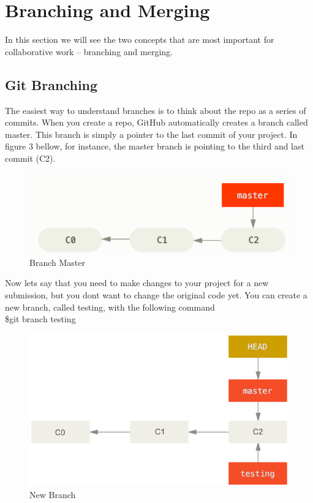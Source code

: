 \documentclass[12pt]{article}
\begin{document}
    \section{Branching and Merging}
    In this section we will see the two concepts that are most important for collaborative work -- branching and merging.
    \subsection{Git Branching}
    \label{sec:branching}
    The easiest way to understand branches is to think about the repo as a series of commits. When you create a repo, GitHub automatically creates a branch called master. This branch is simply a pointer to the last commit of your project. In figure 3 bellow, for instance, the master branch is pointing to the third and last commit (C2). \\
    \begin{figure}[h]
	\caption{Branch Master}
	\includegraphics[scale=0.5]{figure4}
	\centering
    \end{figure} 
    \vspace{0.2 in}
    Now let\textquotesingle s say that you need to make changes to your project for a new submission, but you don\textquotesingle t want to change the original code yet. You  can create a new branch, called testing, with the following command \\
    \indent\indent \$git branch testing \\
    \begin{figure}[h]
	\caption{New Branch}
	\includegraphics[scale=0.5]{figure5}
	\centering
    \end{figure} 
\end{document}
